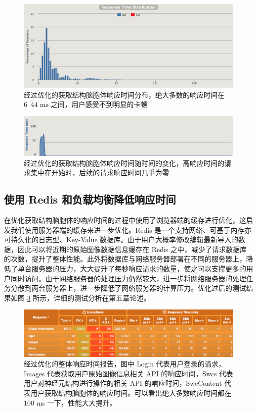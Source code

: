 \begin{figure}[!ht]
\centering
\includegraphics[width=148mm]{images/swcdic}
\caption{经过优化的获取结构脑胞体响应时间分布，绝大多数的响应时间在 6~44 ms 之间，用户感受不到明显的卡顿}
\label{swcdic}
\end{figure}

\begin{figure}[!ht]
\centering
\includegraphics[width=148mm]{images/res-time}
\caption{经过优化的获取结构脑胞体响应时间随时间的变化，高响应时间的请求集中在开始时，后续的请求响应时间几乎为零}
\label{res-time}
\end{figure}

\subsection{使用 Redis 和负载均衡降低响应时间}
在优化获取结构脑胞体的响应时间的过程中使用了浏览器端的缓存进行优化，这启发我们使用服务器端的缓存来进一步优化。Redis 是一个支持网络、可基于内存亦可持久化的日志型、Key-Value 数据库。由于用户大概率修改编辑最新导入的数据，因此可以将近期的原始图像数据信息缓存在 Redis 之中，减少了请求数据库的次数，提升了整体性能。此外将数据库与网络服务器部署在不同的服务器上，降低了单台服务器的压力，大大提升了每秒响应请求的数量，使之可以支撑更多的用户同时访问。由于网络服务器的处理压力仍然较大，进一步将网络服务器的处理任务分散到两台服务器上，进一步降低了网络服务器的计算压力。优化过后的测试结果如图 \ref{opt} 所示，详细的测试分析在第五章论述。

\begin{figure}[!ht]
\centering
\includegraphics[width=148mm]{images/opt}
\caption{经过优化的整体响应时间报告，图中 Login 代表用户登录的请求， Images 代表获取用户原始图像信息相关 API 的响应时间，Swcs 代表用户对神经元结构进行操作的相关 API 的响应时间，SwcContent 代表用户获取结构脑胞体的响应时间。可以看出绝大多数响应时间都在 100 ms 一下，性能大大提升。}
\label{opt}
\end{figure}

